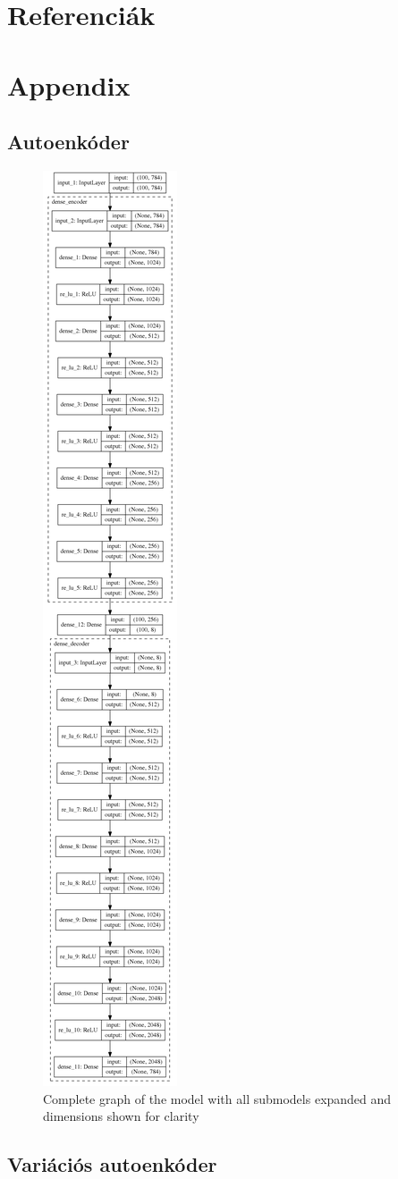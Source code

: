 \documentclass[12pt, english]{article}
\begin{document}
\section*{Referenciák}
\label{sec:references}
\printbibliography[heading=none]

\appendix
\section*{Appendix}
\label{sec:appendix}

\subsection*{Autoenkóder}
\label{sec:auto-encoder}

\begin{figure}[H]
    \centering
    \includegraphics[width=0.12\linewidth]{DenseAutoEncoder_vertical.png} 
    \caption{Complete graph of the model with all submodels expanded and dimensions shown for clarity} 
    \label{fig:dense-auto-encoder}
\end{figure}

\subsection*{Variációs autoenkóder}
\label{sec:vae}
\end{document}
